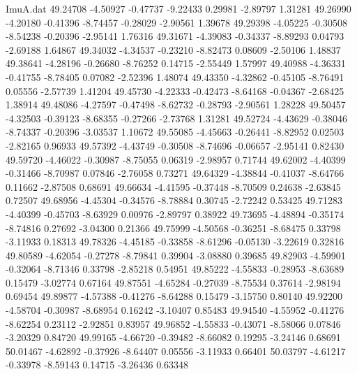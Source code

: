 \begin{filecontents}{ImuA.dat}
  49.24708   -4.50927   -0.47737   -9.22433    0.29981   -2.89797    1.31281
  49.26990   -4.20180   -0.41396   -8.74457   -0.28029   -2.90561    1.39678
  49.29398   -4.05225   -0.30508   -8.54238   -0.20396   -2.95141    1.76316
  49.31671   -4.39083   -0.34337   -8.89293    0.04793   -2.69188    1.64867
  49.34032   -4.34537   -0.23210   -8.82473    0.08609   -2.50106    1.48837
  49.38641   -4.28196   -0.26680   -8.76252    0.14715   -2.55449    1.57997
  49.40988   -4.36331   -0.41755   -8.78405    0.07082   -2.52396    1.48074
  49.43350   -4.32862   -0.45105   -8.76491    0.05556   -2.57739    1.41204
  49.45730   -4.22333   -0.42473   -8.64168   -0.04367   -2.68425    1.38914
  49.48086   -4.27597   -0.47498   -8.62732   -0.28793   -2.90561    1.28228
  49.50457   -4.32503   -0.39123   -8.68355   -0.27266   -2.73768    1.31281
  49.52724   -4.43629   -0.38046   -8.74337   -0.20396   -3.03537    1.10672
  49.55085   -4.45663   -0.26441   -8.82952    0.02503   -2.82165    0.96933
  49.57392   -4.43749   -0.30508   -8.74696   -0.06657   -2.95141    0.82430
  49.59720   -4.46022   -0.30987   -8.75055    0.06319   -2.98957    0.71744
  49.62002   -4.40399   -0.31466   -8.70987    0.07846   -2.76058    0.73271
  49.64329   -4.38844   -0.41037   -8.64766    0.11662   -2.87508    0.68691
  49.66634   -4.41595   -0.37448   -8.70509    0.24638   -2.63845    0.72507
  49.68956   -4.45304   -0.34576   -8.78884    0.30745   -2.72242    0.53425
  49.71283   -4.40399   -0.45703   -8.63929    0.00976   -2.89797    0.38922
  49.73695   -4.48894   -0.35174   -8.74816    0.27692   -3.04300    0.21366
  49.75999   -4.50568   -0.36251   -8.68475    0.33798   -3.11933    0.18313
  49.78326   -4.45185   -0.33858   -8.61296   -0.05130   -3.22619    0.32816
  49.80589   -4.62054   -0.27278   -8.79841    0.39904   -3.08880    0.39685
  49.82903   -4.59901   -0.32064   -8.71346    0.33798   -2.85218    0.54951
  49.85222   -4.55833   -0.28953   -8.63689    0.15479   -3.02774    0.67164
  49.87551   -4.65284   -0.27039   -8.75534    0.37614   -2.98194    0.69454
  49.89877   -4.57388   -0.41276   -8.64288    0.15479   -3.15750    0.80140
  49.92200   -4.58704   -0.30987   -8.68954    0.16242   -3.10407    0.85483
  49.94540   -4.55952   -0.41276   -8.62254    0.23112   -2.92851    0.83957
  49.96852   -4.55833   -0.43071   -8.58066    0.07846   -3.20329    0.84720
  49.99165   -4.66720   -0.39482   -8.66082    0.19295   -3.24146    0.68691
  50.01467   -4.62892   -0.37926   -8.64407    0.05556   -3.11933    0.66401
  50.03797   -4.61217   -0.33978   -8.59143    0.14715   -3.26436    0.63348

\end{filecontents}
